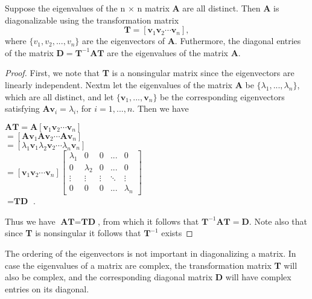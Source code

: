 \documentclass[conference,12pt,onecolumn,compsoc]{IEEEtran}
\begin{document}
\begin{proposition}
Suppose the eigenvalues of the n $\times$ n matrix \textbf{A} are all distinct. Then \textbf{A} is diagonalizable using the transformation matrix
\begin{equation}
\textbf{T} = [ \textbf{v}_1 \textbf{v}_2 \cdots \textbf{v}_n ],
\label{diagonal transformation matrix}
\end{equation}
where $\lbrace v_1, v_2, ..., v_n\rbrace$ are the eigenvectors of \textbf{A}. Futhermore, the diagonal entries of the matrix $\textbf{D} = \textbf{T}^{-1}\textbf{AT}$ are the eigenvalues of the matrix \textbf{A}.
\end{proposition}
\begin{proof}
First, we note that \textbf{T} is a nonsingular matrix since the eigenvectors are linearly independent. Nextm let the eigenvalues of the matrix \textbf{A} be $\lbrace \lambda_1, ..., \lambda_n\rbrace$, which are all distinct, and let $\lbrace \textbf{v}_1, ..., \textbf{v}_n\rbrace$ be the corresponding eigenvectors satisfying $\textbf{Av}_i = \lambda_i$, for $i=1, ..., n$. Then we have
\begin{center}
$\textbf{AT} = \textbf{A} [ \textbf{v}_1 \textbf{v}_2 \cdots \textbf{v}_n ]$ \\
$ =  [ \textbf{Av}_1 \textbf{Av}_2 \cdots \textbf{Av}_n ]$ \\
$ =  [ \lambda_1\textbf{v}_1 \lambda_2\textbf{v}_2 \cdots \lambda_n\textbf{v}_n ]$ \\
$ =  [ \textbf{v}_1 \textbf{v}_2 \cdots \textbf{v}_n ]\begin{bmatrix} \lambda_1 & 0 & 0 & ... & 0 \\ 
0 & \lambda_2 & 0 & ...  & 0 \\

\vdots & \vdots & \vdots & \ddots  & \vdots \\
0 & 0 & 0 & ...  & \lambda_n   \end{bmatrix}$ \\

$ =  \textbf{TD}$ .
\end{center}
Thus we have $\textbf{AT} = \textbf{TD}$, from which it follows that $\textbf{T}^{-1}\textbf{AT} = \textbf{D}$. Note also that since \textbf{T} is nonsingular it follows that $\textbf{T}^{-1}$ exists
\end{proof}

The ordering of the eigenvectors is not important in diagonalizing a matrix. In case the eigenvalues of a matrix are complex, the transformation matrix \textbf{T} will also be complex, and the corresponding diagonal matrix \textbf{D} will have complex entries on its diagonal.
\end{document}
